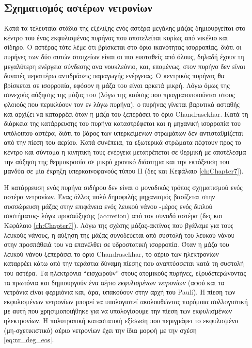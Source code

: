 \subsection{Σχηματισμός αστέρων νετρονίων}
Κατά τα τελευταία στάδια της εξέλιξης ενός αστέρα μεγάλης μάζας δημιουργείται στο κέντρο του ένας εκφυλισμένος πυρήνας που αποτελείται κυρίως από νικέλιο και σίδηρο. Ο αστέρας τότε λέμε ότι βρίσκεται στο όριο ικανότητας ισορροπίας, διότι οι πυρήνες των δύο αυτών στοιχείων είναι οι πιο ευσταθείς από όλους, δηλαδή έχουν τη μεγαλύτερη ενέργεια σύνδεσης ανα νουκλεόνιο, και, επομένως, στον πυρήνα δεν είναι δυνατές περαιτέρω αντιδράσεις παραγωγής ενέργειας. Ο κεντρικός πυρήνας θα βρίσκεται σε ισορροπία, εφόσον η μάζα του είναι αρκετά μικρή. Λόγω όμως της συνεχούς αύξησης της μάζας του (λόγω της καύσης που πραγματοποιούνται στους φλοιούς που περικλύουν τον εν λόγω πυρήνα), ο πυρήνας γίνεται βαρυτικά ασταθής και αρχίζει να καταρρέει όταν η μάζα του ξεπεράσει το όριο Chandrasekhar. Κατά τη διάρκεια της κατάρρευσης του πυρήνα καταστρέφεται και η μηχανική ισορροπία του υπόλοιπου αστέρα, διότι το βάρος των υπερκείμενων στρωμάτων δεν αντισταθμίζεται από την πίεση του αερίου. Κατά συνέπεια, τα εξωτερικά στρώματα πέφτουν προς το κέντρο και σύντομα η κινητική τους ενέργεια μετατρέπεται σε θερμική με αποτέλεσμα την αύξηση της θερμοκρασία σε μικρό χρονικό διάστημα και την εκτόξευση του μανδύα σε μία έκρηξη υπερκαινοφανούς τύπου ΙΙ (δες και Κεφάλαιο \ref{ch:Chapter7}).

Η κατάρρευση ενός πυρήνα σιδήρου δεν είναι ο μοναδικός τρόπος σχηματισμού ενός αστέρα νετρονίων. Ένας άλλος πολύ δημοφιλής μηχανισμός βασίζεται στην συσσώρευση μάζας στην επιφάνεια ενός λευκού νάνου -μέρος ενός διπλού συστήματος- λόγω προσαύξησης (accretion) από τον συνοδό αστέρα (δες και Κεφάλαιο \ref{ch:Chapter7}). Λόγω της σχέσης μάζας-ακτίνας που βγάλαμε για τους λευκούς νάνους, η αύξηση της μάζας συνοδεύεται από συστολή του λευκού νάνου στην προσπάθειά του να επανέλθει σε υδροστατική ισορροπία. Όταν η μάζα του λευκού νάνου ξεπεράσει το όριο Chandrasekhar, το αέριο των ηλεκτρονίων καταρρέει κάτω από την τεράστια δύναμη πίεσης που αναπτύσσεται κατά τη συστολή του αστέρα. Τα ηλεκτρόνια ``εισχωρούν'' στους ατομικούς πυρήνες, εξουδετερώνοντας τα πρωτόνια και δημιουργούν ένα αέριο \textit{εκφυλισμένων νετρονίων} (αφού και τα νετρόνια είναι φερμιόνια και, άρα, υπακούουν στην αρχή του Pauli). Η πίεση των εκφυλισμένων νετρονίων μπορεί να υπολογιστεί ακολουθώντας παρόμοια συλλογιστική με αυτή που χρησιμοποιήθηκε για να υπολογίσουμε την πίεση των εκφυλισμένων ηλεκτρονίων. Η πολυτροπική καταστατική εξίσωση που περιγράφει το εκφυλισμένο (μη-σχετικιστικό) αέριο νετρονίων έχει την ίδια μορφή με την σχέση \eqref{eq:nr_deg_eos}.

